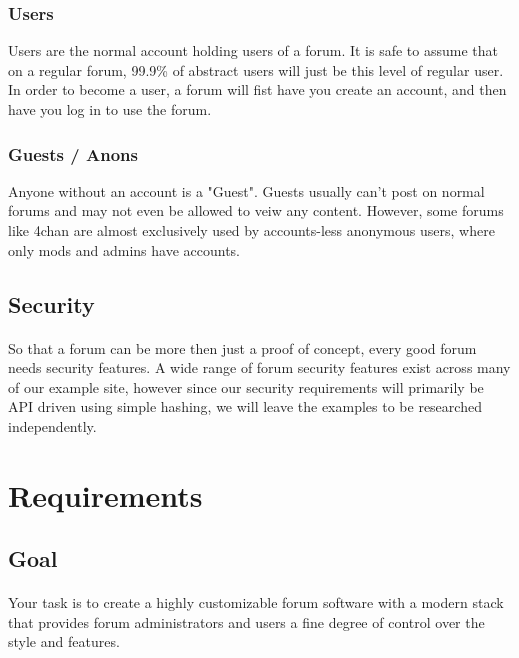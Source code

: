 \documentclass[]{article}
\begin{document}
\subsubsection{Users}
Users are the normal account holding users of a forum. It is safe to assume that on a regular forum, 99.9\% of abstract users will just be this level of regular user. In order to become a user, a forum will fist have you create an account, and then have you log in to use the forum. 

\subsubsection{Guests / Anons}
Anyone without an account is a "Guest". Guests usually can't post on normal forums and may not even be allowed to veiw any content. However, some forums like 4chan are almost exclusively used by accounts-less anonymous users, where only mods and admins have accounts.\footnotemark
{} 

\subsection{Security}
\paragraph{}
So that a forum can be more then just a proof of concept, every good forum needs security features. A wide range of forum security features exist across many of our example site, however since our security requirements will primarily be API driven using simple hashing, we will leave the examples to be researched independently. 

\section{Requirements}
\subsection{Goal}
\paragraph{}
Your task is to create a highly customizable forum software with a modern stack that provides forum administrators and users a fine degree of control over the style and features. 
\end{document}
